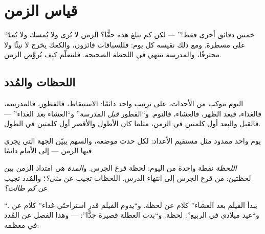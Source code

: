\chapter{قياس الزمن}\label{ch:g2:measuring-time}

``خمس دقائق أخرى فقط!'' --- لكن كم تبلغ هذه حقًّا؟ الزمن لا يُرى
ولا يُمسك ولا يُمدّ على مسطرة. ومع ذلك نقيسه كل يوم: فللسباقات
فائزون، والكعك يخرج لا نيئًا ولا محترقًا، والمدرسة تنتهي في اللحظة
الصحيحة. فلنتعلّم كيف يُروَّض الزمن.

\section{اللحظات والمُدد}

\begin{example}\label{ex:g2:measuring-time:order}
اليوم موكب من الأحداث، على ترتيب واحد دائمًا: الاستيقاظ، فالفطور،
فالمدرسة، فالغداء، فبعد الظهر، فالعشاء، فالنوم. و``الفطور
\emph{قبل} المدرسة'' و``العشاء \emph{بعد} الغداء'' --- فالقبل
والبعد أول كلمتين في الزمن، مثلما كان الأطول والأقصر أول كلمتين في
الطول.
\end{example}

\begin{omfigure}

{\small يوم واحد ممدود مثل مستقيم الأعداد: لكل حدث موضعه، والسهم
يبيّن الجهة التي يجري فيها الزمن --- إلى الأمام دائمًا.}
\end{omfigure}

\begin{definition}[المدة]\label{def:g2:measuring-time:duration}
\emph{اللحظة} نقطة واحدة من اليوم: لحظة قرع الجرس.
و\emph{المدة} هي امتداد الزمن بين لحظتين: من قرع الجرس
إلى انتهاء الدرس. اللحظات تجيب عن \emph{متى؟}؛ والمُدد تجيب عن
\emph{كم طالت؟}
\end{definition}

\begin{example}\label{ex:g2:measuring-time:whenhowlong}
``يبدأ الفيلم بعد العشاء'' كلام عن لحظة. و``يدوم الفيلم قدر
استراحتَي غداء'' كلام عن . و``عيد ميلادي في الربيع'': لحظة.
و``بدت العطلة قصيرة جدًّا'':  --- وهذا الفصل عن المُدد في
معظمه.
\end{example}

